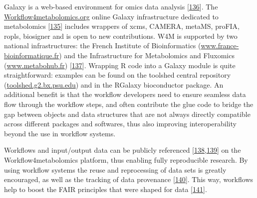 \documentclass[]{article}
\begin{document}
Galaxy is a web-based environment for omics data analysis {[}\protect\hyperlink{ref-goecks_2010}{136}{]}. The \href{http://workflow4metabolomics.org}{Workflow4metabolomics.org} online Galaxy infrastructure dedicated to metabolomics {[}\protect\hyperlink{ref-giacomoni_2015}{135}{]} includes wrappers of xcms, CAMERA, metaMS, proFIA, ropls, biosigner and is open to new contributions. W4M is supported by two national infrastructures: the French Institute of Bioinformatics (\href{http://www.france-bioinformatique.fr/en}{www.france-bioinformatique.fr}) and the Infrastructure for Metabolomics and Fluxomics (\href{https://www.metabohub.fr/}{www.metabohub.fr}) {[}\protect\hyperlink{ref-metabohub_website_2019}{137}{]}. Wrapping R code into a Galaxy module is quite straightforward: examples can be found on the toolshed central repository (\href{https://toolshed.g2.bx.psu.edu/}{toolshed.g2.bx.psu.edu}) and in the RGalaxy bioconductor package. An additional benefit is that the workflow developers need to ensure seamless data flow through the workflow steps, and often contribute the glue code to bridge the gap between objects and data structures that are not always directly compatible across different packages and softwares, thus also improving interoperability beyond the use in workflow systems.

Workflows and input/output data can be publicly referenced {[}\protect\hyperlink{ref-guitton_2017}{138},\protect\hyperlink{ref-workflow4metabolomics_website_nd}{139}{]} on the Workflow4metabolomics platform, thus enabling fully reproducible research. By using workflow systems the reuse and reprocessing of data sets is greatly encouraged, as well as the tracking of data provenance {[}\protect\hyperlink{ref-goble_2019}{140}{]}. This way, workflows help to boost the FAIR principles that were shaped for data {[}\protect\hyperlink{ref-wilkinson_2016}{141}{]}.
\end{document}
